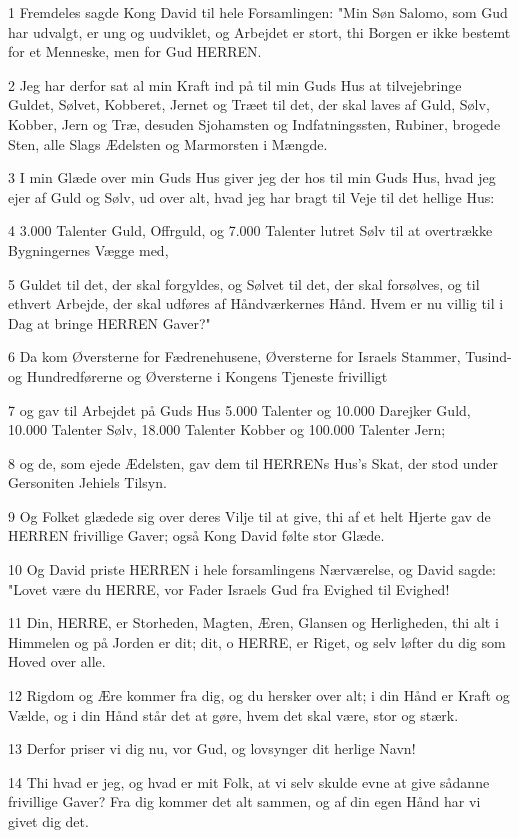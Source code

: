 \par 1 Fremdeles sagde Kong David til hele Forsamlingen: "Min Søn Salomo, som Gud har udvalgt, er ung og uudviklet, og Arbejdet er stort, thi Borgen er ikke bestemt for et Menneske, men for Gud HERREN.
\par 2 Jeg har derfor sat al min Kraft ind på til min Guds Hus at tilvejebringe Guldet, Sølvet, Kobberet, Jernet og Træet til det, der skal laves af Guld, Sølv, Kobber, Jern og Træ, desuden Sjohamsten og Indfatningssten, Rubiner, brogede Sten, alle Slags Ædelsten og Marmorsten i Mængde.
\par 3 I min Glæde over min Guds Hus giver jeg der hos til min Guds Hus, hvad jeg ejer af Guld og Sølv, ud over alt, hvad jeg har bragt til Veje til det hellige Hus:
\par 4 3.000 Talenter Guld, Offrguld, og 7.000 Talenter lutret Sølv til at overtrække Bygningernes Vægge med,
\par 5 Guldet til det, der skal forgyldes, og Sølvet til det, der skal forsølves, og til ethvert Arbejde, der skal udføres af Håndværkernes Hånd. Hvem er nu villig til i Dag at bringe HERREN Gaver?"
\par 6 Da kom Øversterne for Fædrenehusene, Øversterne for Israels Stammer, Tusind- og Hundredførerne og Øversterne i Kongens Tjeneste frivilligt
\par 7 og gav til Arbejdet på Guds Hus 5.000 Talenter og 10.000 Darejker Guld, 10.000 Talenter Sølv, 18.000 Talenter Kobber og 100.000 Talenter Jern;
\par 8 og de, som ejede Ædelsten, gav dem til HERRENs Hus's Skat, der stod under Gersoniten Jehiels Tilsyn.
\par 9 Og Folket glædede sig over deres Vilje til at give, thi af et helt Hjerte gav de HERREN frivillige Gaver; også Kong David følte stor Glæde.
\par 10 Og David priste HERREN i hele forsamlingens Nærværelse, og David sagde: "Lovet være du HERRE, vor Fader Israels Gud fra Evighed til Evighed!
\par 11 Din, HERRE, er Storheden, Magten, Æren, Glansen og Herligheden, thi alt i Himmelen og på Jorden er dit; dit, o HERRE, er Riget, og selv løfter du dig som Hoved over alle.
\par 12 Rigdom og Ære kommer fra dig, og du hersker over alt; i din Hånd er Kraft og Vælde, og i din Hånd står det at gøre, hvem det skal være, stor og stærk.
\par 13 Derfor priser vi dig nu, vor Gud, og lovsynger dit herlige Navn!
\par 14 Thi hvad er jeg, og hvad er mit Folk, at vi selv skulde evne at give sådanne frivillige Gaver? Fra dig kommer det alt sammen, og af din egen Hånd har vi givet dig det.
